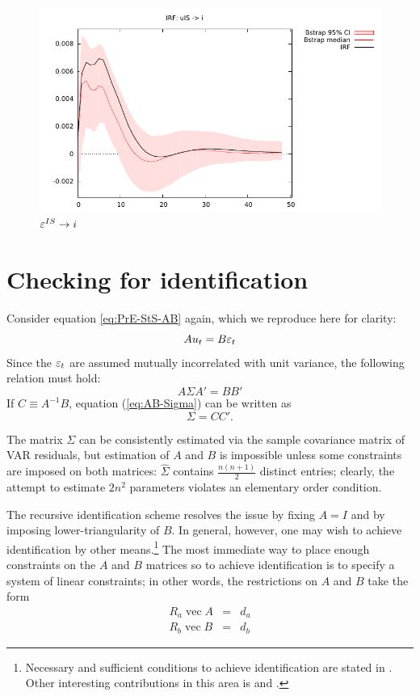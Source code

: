 \documentclass[a4paper,10pt]{article}
\newcommand{\PrE}[1]{\ensuremath u_{#1}} %
\newcommand{\StS}[1]{\ensuremath \varepsilon_{#1}} %
\DeclareMathOperator{\VEC}{\mathrm{vec}}
\begin{document}
\begin{figure}[htbp]
  \centering
  \includegraphics{dynamic_IS}
  \caption{$\StS{}^{IS} \to i$}
  \label{fig:Dynamic-IS}
\end{figure}

\section{Checking for identification}
\label{sec:SVARid}

Consider equation \eqref{eq:PrE-StS-AB} again, which we reproduce
here for clarity:
\[
  A \PrE{t} = B \StS{t}
\]
Since the $\StS{t}$ are assumed mutually incorrelated with unit variance,
the following relation must hold:
\begin{equation}
  \label{eq:AB-Sigma}
  A \Sigma A' = B B'
\end{equation}
If $C \equiv A^{-1}B$, equation (\ref{eq:AB-Sigma}) can be written as
\[
  \Sigma = C C'.
\]

The matrix $\Sigma$ can be consistently estimated via the sample
covariance matrix of VAR residuals, but estimation of $A$ and $B$ is
impossible unless some constraints are imposed on both matrices:
$\hat{\Sigma}$ contains $\frac{n (n+1)}{2}$ distinct entries; clearly,
the attempt to estimate $2 n^2$ parameters violates an elementary
order condition. 

The recursive identification scheme resolves the issue by fixing $A=I$
and by imposing lower-triangularity of $B$. In general, however, one
may wish to achieve identification by other means.\footnote{Necessary
  and sufficient conditions to achieve identification are stated in
  \cite{ET06}. Other interesting contributions in this area is
  \cite{RR-W-Zha10} and \cite{Bacchiocchi11}.}  The most immediate way
to place enough constraints on the $A$ and $B$ matrices so to achieve
identification is to specify a system of linear constraints; in other
words, the restrictions on $A$ and $B$ take the form
\begin{eqnarray}
  \label{eq:ImpConstA}
  R_a \VEC A & = & d_a \\
  \label{eq:ImpConstB}
  R_b \VEC B & = & d_b 
\end{eqnarray}
\end{document}
